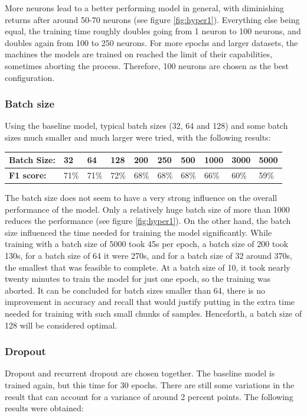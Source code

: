\documentclass[
a4paper,
pagesize,
pdftex,
12pt,
twoside, %
BCOR=5mm, %
ngerman,
fleqn,
final,
]{scrartcl}
\begin{document}
	More neurons lead to a better performing model in general, with diminishing returns after around 50-70 neurons (see figure \ref{fig:hyper1}). Everything else being equal, the training time roughly doubles going from 1 neuron to 100 neurons, and doubles again from 100 to 250 neurons. For more epochs and larger datasets, the machines the models are trained on reached the limit of their capabilities, sometimes aborting the process. Therefore, 100 neurons are chosen as the best configuration.
	
	\subsubsection{Batch size}
	Using the baseline model, typical batch sizes (32, 64 and 128) and some batch sizes much smaller and much larger were tried, with the following results: 
	
	\begin{tabular} { | p{3cm} || p{0.8cm} | p{0.8cm}  | p{0.8cm}  |p{0.8cm} | p{0.8cm} | p{0.8cm} | p{0.8cm} | p{0.8cm}| p{0.8cm} |}
		\hline
		\textbf{Batch Size:}  &  32 & 64 & 128 & 200 & 250 & 500 & 1000 & 3000 &5000\\   
		\hline
		\textbf{F1 score:} & 71\% & 71\% & 72\% & 68\% & 68\% & 68\% & 66\% & 60\% & 59\%\\
		\hline
		\hline
	\end{tabular}
	
	The batch size does not seem to have a very strong influence on the overall performance of the model. Only a relatively huge batch size of more than 1000 reduces the performance (see figure \ref{fig:hyper1}). On the other hand, the batch size influenced the time needed for training the model significantly. While training with a batch size of 5000 took 45s per epoch, a batch size of 200 took 130s, for a batch size of 64 it were 270s, and for a batch size of 32 around 370s, the smallest that was feasible to complete. At a batch size of 10, it took nearly twenty minutes to train the model for just one epoch, so the training was aborted. It can be concluded for batch sizes smaller than 64, there is no improvement in accuracy and recall that would justify putting in the extra time needed for training with such small chunks of samples. Henceforth, a batch size of 128 will be considered optimal.

	\subsubsection{Dropout}
	Dropout and recurrent dropout are chosen together. The baseline model is trained again, but this time for 30 epochs. There are still some variations in the result that can account for a variance of around 2 percent points. The following results were obtained:
	
\end{document}
